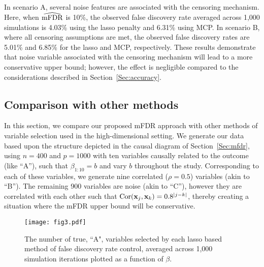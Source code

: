 
In scenario A, several noise features are associated with the censoring mechanism.  Here, when $\widehat{\textrm{mFDR}}$ is 10\%, the observed false discovery rate averaged across 1,000 simulations is 4.03\% using the lasso penalty and 6.31\% using MCP.  In scenario B, where all censoring assumptions are met, the observed false discovery rates are 5.01\% and 6.85\% for the lasso and MCP, respectively.  These results demonstrate that noise variable associated with the censoring mechanism will lead to a more conservative upper bound; however, the effect is negligible compared to the considerations described in Section~\ref{Sec:accuracy}.

\subsection{Comparison with other methods}
\label{Sec:sim-comp}

In this section, we compare our proposed mFDR approach with other methods of variable selection used in the high-dimensional setting. We generate our data based upon the structure depicted in the causal diagram of Section~\ref{Sec:mfdr}, using $n = 400$ and $p = 1000$ with ten variables causally related to the outcome (like ``A''), such that $\beta_{1:10} = b$ and vary $b$ throughout the study. Corresponding to each of these variables, we generate nine correlated ($\rho = 0.5$) variables (akin to ``B''). The remaining 900 variables are noise (akin to ``C''), however they are correlated with each other such that $\textrm{Cor}(\mathbf{x}_j,\mathbf{x}_k) = 0.8^{|j - k|}$, thereby creating a situation where the mFDR upper bound will be conservative.

\begin{figure} [htb!]
 \centering
  \texttt{[image: fig3.pdf]}
  \caption{\label{Fig:lassopower} The number of true, ``A", variables selected by each lasso based method of false discovery rate control, averaged across 1,000 simulation iterations plotted as a function of $\beta$.}
\end{figure}


